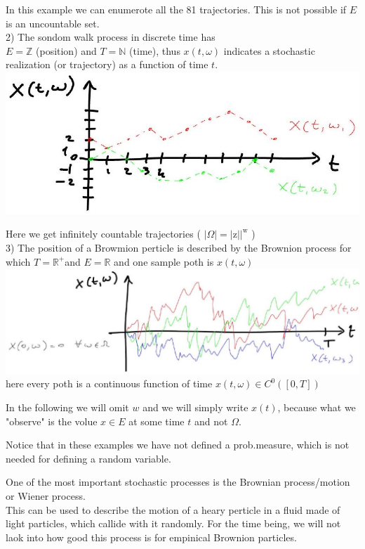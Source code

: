 \documentclass[10pt]{article}
\begin{document}
In this example we can enumerote all the 81 trajectories. This is not possible if $E$ is an uncountable set.\\
2) The sondom walk process in discrete time has\\
$E=\mathbb{Z}$ (position) and $T=\mathbb{N}$ (time), thus $x(t, \omega)$ indicates a stochastic realization (or trajectory) as a function of time $t$.\\
\includegraphics[max width=\textwidth, center]{2025_10_17_79731b7d4e7690819b81g-03(1)}

Here we get infinitely countable trajectories ( $|\Omega|=\left.|\mathrm{z}|\right|^{\mathrm{w}}$ )\\
3) The position of a Browmion perticle is described by the Brownion process for which $T=\mathbb{R}^{+}$and $E=\mathbb{R}$ and one sample poth is $x(t, \omega)$\\
\includegraphics[max width=\textwidth, center]{2025_10_17_79731b7d4e7690819b81g-03(2)}\\
here every poth is a continuous function of time $x(t, \omega) \in C^{0}([0, T])$

In the following we will omit $w$ and we will simply write $x(t)$, because what we "observe" is the volue $x \in E$ at some time $t$ and not $\Omega$.

Notice that in these examples we have not defined a prob.measure, which is not needed for defining a random variable.

One of the most important stochastic processes is the Brownian process/motion or Wiener process.\\
This can be used to describe the motion of a heary perticle in a fluid made of light particles, which callide with it randomly. For the time being, we will not laok into how good this process is for empinical Brownion particles.
\end{document}
